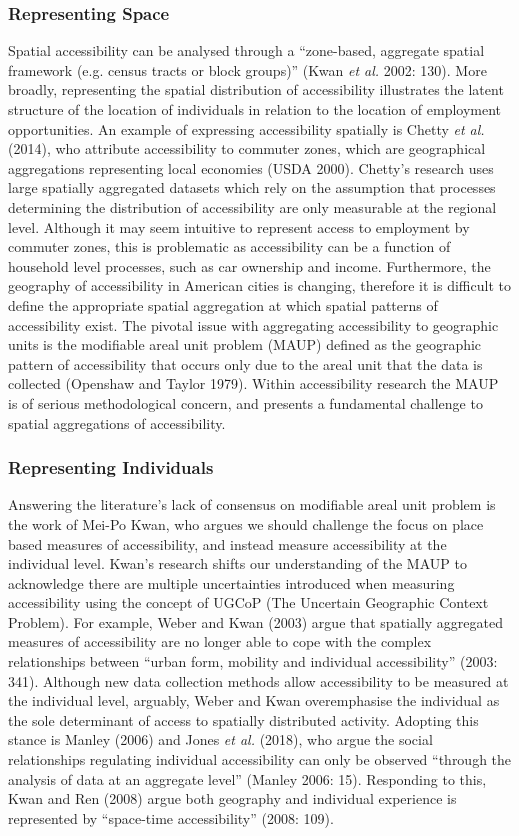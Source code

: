\documentclass[a4paper,UKenglish]{lipics-v2018}
\begin{document}
\subsubsection{Representing Space}
Spatial accessibility can be analysed through a “zone-based, aggregate spatial framework (e.g. census tracts or block groups)” (Kwan \textit{et al.} 2002: 130). More broadly, representing the spatial distribution of accessibility illustrates the latent structure of the location of individuals in relation to the location of employment opportunities. An example of expressing accessibility spatially is Chetty \textit{et al.} (2014), who attribute accessibility to commuter zones, which are geographical aggregations representing local economies (USDA 2000). Chetty’s research uses large spatially aggregated datasets which rely on the assumption that processes determining the distribution of accessibility are only measurable at the regional level. Although it may seem intuitive to represent access to employment by commuter zones, this is problematic as accessibility can be a function of household level processes, such as car ownership and income. Furthermore, the geography of accessibility in American cities is changing, therefore it is difficult to define the appropriate spatial aggregation at which spatial patterns of accessibility exist. The pivotal issue with aggregating accessibility to geographic units is the modifiable areal unit problem (MAUP) defined as the geographic pattern of accessibility that occurs only due to the areal unit that the data is collected (Openshaw and Taylor 1979). Within accessibility research the MAUP is of serious methodological concern, and presents a fundamental challenge to spatial aggregations of accessibility.

\subsubsection{Representing Individuals}
Answering the literature’s lack of consensus on modifiable areal unit problem is the work of Mei-Po Kwan, who argues we should challenge the focus on place based measures of accessibility, and instead measure accessibility at the individual level. Kwan’s research shifts our understanding of the MAUP to acknowledge there are multiple uncertainties introduced when measuring accessibility using the concept of UGCoP (The Uncertain Geographic Context Problem). For example, Weber and Kwan (2003) argue that spatially aggregated measures of accessibility are no longer able to cope with the complex relationships between “urban form, mobility and individual accessibility” (2003: 341). Although new data collection methods allow accessibility to be measured at the individual level, arguably, Weber and Kwan overemphasise the individual as the sole determinant of access to spatially distributed activity. Adopting this stance is Manley (2006) and Jones \textit{et al.} (2018), who argue the social relationships regulating individual accessibility can only be observed “through the analysis of data at an aggregate level” (Manley 2006: 15). Responding to this, Kwan and Ren (2008) argue both geography and individual experience is represented by “space-time accessibility” (2008: 109).
\end{document}
